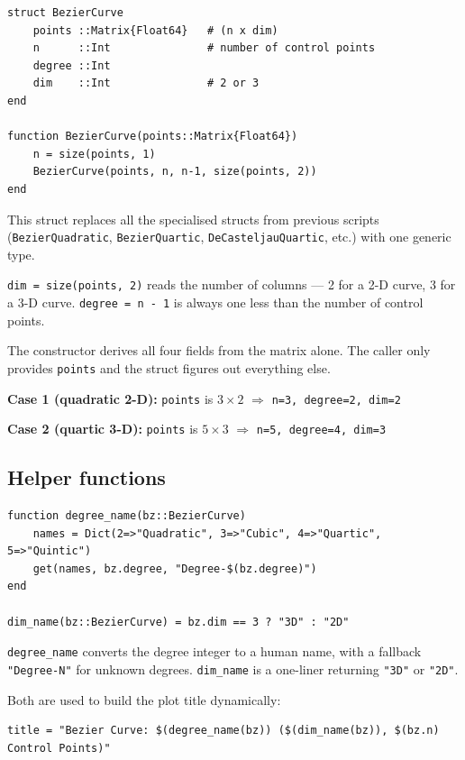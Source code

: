 \documentclass[12pt, a4paper]{article}
\newcommand{\cd}[1]{\texttt{#1}}
\begin{document}
\begin{verbatim}
struct BezierCurve
    points ::Matrix{Float64}   # (n x dim)
    n      ::Int               # number of control points
    degree ::Int
    dim    ::Int               # 2 or 3
end

function BezierCurve(points::Matrix{Float64})
    n = size(points, 1)
    BezierCurve(points, n, n-1, size(points, 2))
end
\end{verbatim}

This struct replaces all the specialised structs from
previous scripts (\cd{BezierQuadratic}, \cd{BezierQuartic},
\cd{DeCasteljauQuartic}, etc.) with one generic type.

\cd{dim = size(points, 2)} reads the number of columns ---
2 for a 2-D curve, 3 for a 3-D curve.
\cd{degree = n - 1} is always one less than the number
of control points.

The constructor derives all four fields from the matrix
alone.
The caller only provides \cd{points} and the struct
figures out everything else.

\begin{examplebox}
\textbf{Case 1 (quadratic 2-D):}
\cd{points} is $3\times2$ $\Rightarrow$ \cd{n=3, degree=2, dim=2}

\textbf{Case 2 (quartic 3-D):}
\cd{points} is $5\times3$ $\Rightarrow$ \cd{n=5, degree=4, dim=3}
\end{examplebox}

\subsection{Helper functions}

\begin{verbatim}
function degree_name(bz::BezierCurve)
    names = Dict(2=>"Quadratic", 3=>"Cubic", 4=>"Quartic", 5=>"Quintic")
    get(names, bz.degree, "Degree-$(bz.degree)")
end

dim_name(bz::BezierCurve) = bz.dim == 3 ? "3D" : "2D"
\end{verbatim}

\cd{degree\_name} converts the degree integer to a human
name, with a fallback \cd{"Degree-N"} for unknown degrees.
\cd{dim\_name} is a one-liner returning \cd{"3D"} or \cd{"2D"}.

Both are used to build the plot title dynamically:
\begin{verbatim}
title = "Bezier Curve: $(degree_name(bz)) ($(dim_name(bz)), $(bz.n) Control Points)"
\end{verbatim}
\end{document}
